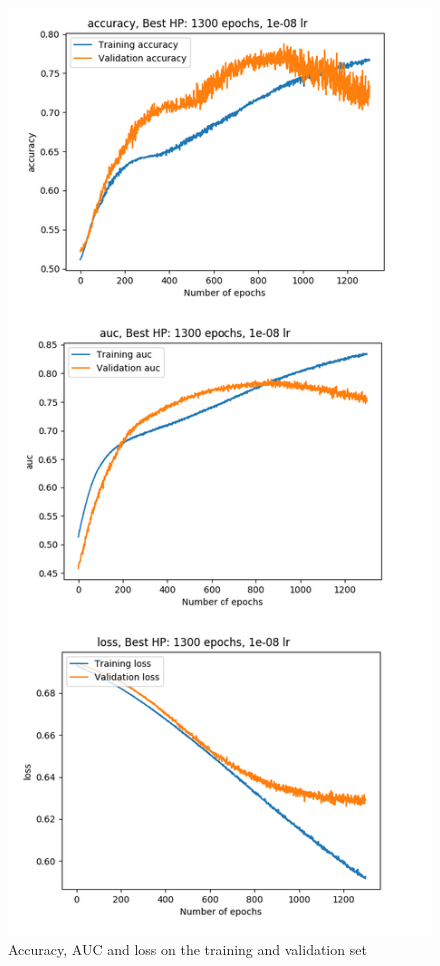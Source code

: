 \begin{figure}[!h]
\centering
\includegraphics[width=1\textwidth, height=\textheight, keepaspectratio=true]{./figures/paper_reproduction_results_part1.png}
\caption{Accuracy, AUC and loss on the training and validation set}
\label{fig:paper_reprodution_results_part_1}
\end{figure}

